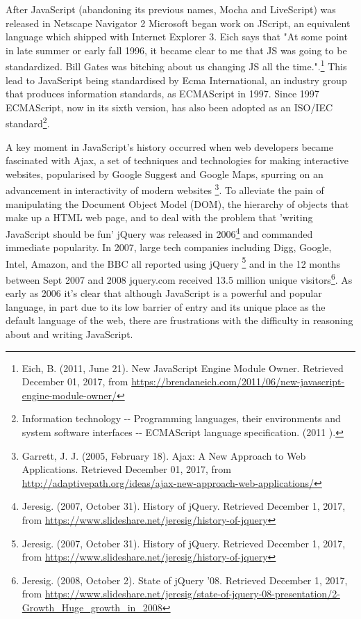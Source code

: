 \documentclass[]{article}
\begin{document}
After JavaScript (abandoning its previous names, Mocha and LiveScript)
was released in Netscape Navigator 2 Microsoft began work on JScript, an
equivalent language which shipped with Internet Explorer 3. Eich says
that "At some point in late summer or early fall 1996, it became clear
to me that JS was going to be standardized. Bill Gates was bitching
about us changing JS all the time.".\footnote{Eich, B. (2011, June 21).
  New JavaScript Engine Module Owner. Retrieved December 01, 2017, from
  \url{https://brendaneich.com/2011/06/new-javascript-engine-module-owner/}}
This lead to JavaScript being standardised by Ecma International, an
industry group that produces information standards, as ECMAScript in
1997. Since 1997 ECMAScript, now in its sixth version, has also been
adopted as an ISO/IEC standard\footnote{Information technology -\/-
  Programming languages, their environments and system software
  interfaces -\/- ECMAScript language specification. (2011 ).}.

A key moment in JavaScript's history occurred when web developers became
fascinated with Ajax, a set of techniques and technologies for making
interactive websites, popularised by Google Suggest and Google Maps,
spurring on an advancement in interactivity of modern websites
\footnote{Garrett, J. J. (2005, February 18). Ajax: A New Approach to
  Web Applications. Retrieved December 01, 2017, from
  \url{http://adaptivepath.org/ideas/ajax-new-approach-web-applications/}}.
To alleviate the pain of manipulating the Document Object Model (DOM),
the hierarchy of objects that make up a HTML web page, and to deal with
the problem that 'writing JavaScript should be fun' jQuery was released
in 2006\footnote{Jeresig. (2007, October 31). History of jQuery.
  Retrieved December 1, 2017, from
  \url{https://www.slideshare.net/jeresig/history-of-jquery}} and
commanded immediate popularity. In 2007, large tech companies including
Digg, Google, Intel, Amazon, and the BBC all reported using jQuery
\footnote{Jeresig. (2007, October 31). History of jQuery. Retrieved
  December 1, 2017, from
  \url{https://www.slideshare.net/jeresig/history-of-jquery}} and in the
12 months between Sept 2007 and 2008 jquery.com received 13.5 million
unique visitors\footnote{Jeresig. (2008, October 2). State of jQuery
  '08. Retrieved December 1, 2017, from
  \url{https://www.slideshare.net/jeresig/state-of-jquery-08-presentation/2-Growth_Huge_growth_in_2008}}.
As early as 2006 it's clear that although JavaScript is a powerful and
popular language, in part due to its low barrier of entry and its unique
place as the default language of the web, there are frustrations with
the difficulty in reasoning about and writing JavaScript.
\end{document}
